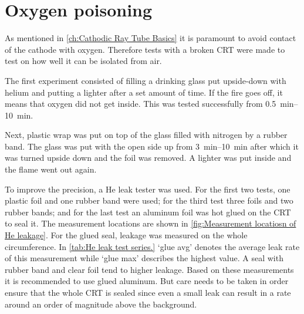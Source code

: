 \section{Oxygen poisoning}
\label{sec:Oxygen poisoning}


As mentioned in \cref{ch:Cathodic Ray Tube Basics} it is paramount to avoid contact of the cathode with oxygen. Therefore tests with a broken CRT were made to test on how well it can be isolated from air.

The first experiment consisted of filling a drinking glass put upside-down with helium and putting a lighter after a set amount of time. If the fire goes off, it means that oxygen did not get inside. This was tested successfully from \SIrange{0.5}{10}{\minute}.

Next, plastic wrap was put on top of the glass filled with nitrogen by a rubber band. The glass was put with the open side up from \SIrange{3}{10}{\minute} after which it was turned upside down and the foil was removed. A lighter was put inside and the flame went out again.

To improve the precision, a He leak tester was used. For the first two tests, one plastic foil and one rubber band were used; for the third test three foils and two rubber bands; and for the last test an aluminum foil was hot glued on the CRT to seal it. The measurement locations are shown in \cref{fig:Measurement locatiosn of He leakage}. For the glued seal, leakage was measured on the whole circumference. In \cref{tab:He leak test series.} `glue avg' denotes the average leak rate of this measurement while `glue max' describes the highest value. A seal with rubber band and clear foil tend to higher leakage. Based on these measurements it is recommended to use glued aluminum. But care needs to be taken in order ensure that the whole CRT is sealed since even a small leak can result in a rate around an order of magnitude above the background.

